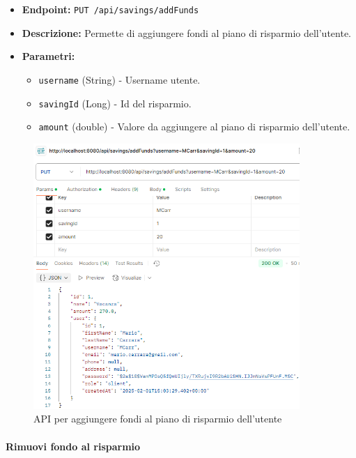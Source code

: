 \begin{itemize}
    \item \textbf{Endpoint:} \texttt{PUT /api/savings/addFunds}
    \item \textbf{Descrizione:} Permette di aggiungere fondi al piano di risparmio dell'utente.
    \item \textbf{Parametri:}
    \begin{itemize}
        \item \texttt{username} (String) - Username utente.
        \item \texttt{savingId} (Long) - Id del risparmio.
        \item \texttt{amount} (double) - Valore da aggiungere al piano di risparmio dell'utente.
    \end{itemize}
\end{itemize}

\begin{figure}[H]
    \centering
    \includegraphics[width=0.9\textwidth]{images/AddFundsSavingAPI.png}
    \caption{API per aggiungere fondi al piano di risparmio dell'utente}
    \label{fig:AddFundsSavingAPI}
\end{figure}

\paragraph{Rimuovi fondo al risparmio} 


